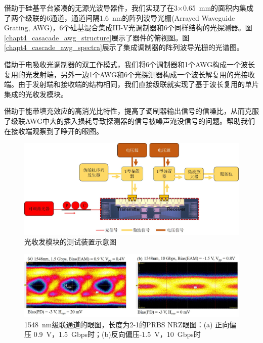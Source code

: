 借助于硅基平台紧凑的无源光波导器件，我们实现了在3$\times$0.65~mm的面积内集成了两个级联的6通道，通道间隔1.6~nm的阵列波导光栅(Arrayed Waveguide Grating, AWG)，6个硅基混合集成III-V光调制器和6个同样结构的光探测器。图\ref{chapt4_casacade_awg_structure}展示了器件的俯视图。图\ref{chapt4_cascade_awg_spectra}展示了集成调制器的阵列波导光栅的光谱图。

借助于电吸收光调制器的双工作模式，我们将6个调制器和1个AWG构成一个波长复用的光发射端，另外一边1个AWG和6个光探测器构成一个波长解复用的光接收端。由于发射端和接收端的结构相同，我们直接级联就实现了基于波长复用的单片集成的光收发模块。

借助于能带填充效应的高消光比特性，提高了调制器输出信号的信噪比，从而克服了级联AWG中大的插入损耗导致探测器的信号被噪声淹没信号的问题。帮助我们在接收端观察到了睁开的眼图。

\begin{figure}[htb]
	\centering
	\includegraphics[width=15cm]{./Pictures/chapt4_tranciever_measure.jpg}
	\caption{光收发模块的测试装置示意图}
	\label{chapt4_tranciever_measure}
\end{figure}

\begin{figure}[htb]
	\centering
	\includegraphics[width=15cm]{./Pictures/chapt4_cascade_eyediagram.jpg}
	\caption{1548~nm级联通道的眼图，长度为2-1的PRBS NRZ眼图：(a) 正向偏压 0.9~V，1.5~Gbps时；(b)反向偏压-1.5~V，10~Gbps时}
	\label{chapt4_cascade_eyediagram}
\end{figure}

